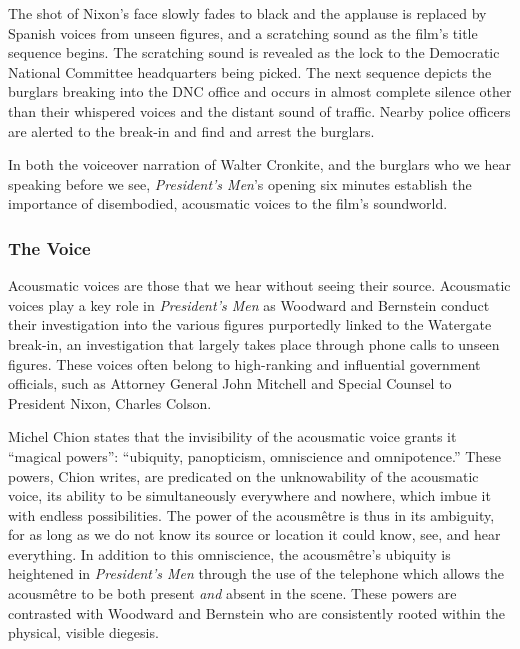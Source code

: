 The shot of Nixon's face slowly fades to black and the applause is replaced by Spanish voices from unseen figures, and a scratching sound as the film's title sequence begins.
The scratching sound is revealed as the lock to the Democratic National Committee headquarters being picked.
The next sequence depicts the burglars breaking into the DNC office and occurs in almost complete silence other than their whispered voices and the distant sound of traffic.
Nearby police officers are alerted to the break-in and find and arrest the burglars.

In both the voiceover narration of Walter Cronkite, and the burglars who we hear speaking before we see, \textit{President's Men}'s opening six minutes establish the importance of disembodied, acousmatic voices to the film's soundworld.


\subsubsection{The Voice
}

Acousmatic voices are those that we hear without seeing their source.
Acousmatic voices play a key role in \textit{President’s Men} as Woodward and Bernstein conduct their investigation into the various figures purportedly linked to the Watergate break-in, an investigation that largely takes place through phone calls to unseen figures.
These voices often belong to high-ranking and influential government officials, such as Attorney General John Mitchell and Special Counsel to President Nixon, Charles Colson.

Michel Chion states that the invisibility of the acousmatic voice grants it ``magical powers”: ``ubiquity, panopticism, omniscience and omnipotence.”\autocites[][23-24]{chion_voice_1999}
These powers, Chion writes, are predicated on the unknowability of the acousmatic voice, its ability to be simultaneously everywhere and nowhere, which imbue it with endless possibilities.
The power of the acousmêtre is thus in its ambiguity, for as long as we do not know its source or location it could know, see, and hear everything.\autocites[Chion uses the term ``acousmêtre" to define a figure that is heard but not yet seen.][21]{chion_voice_1999}
In addition to this omniscience, the acousmêtre's ubiquity is heightened in \textit{President's Men} through the use of the telephone which allows the acousmêtre to be both present \textit{and} absent in the scene.
These powers are contrasted with Woodward and Bernstein who are consistently rooted within the physical, visible diegesis.

